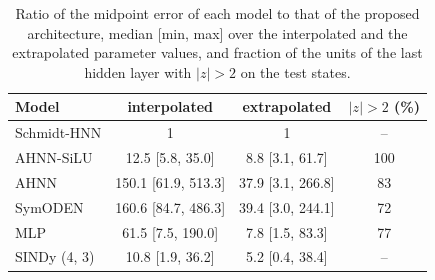 \begin{table}[htbp]
  \centering
  \caption{Ratio of the midpoint error of each model to that of the
    proposed architecture, median [min, max] over the interpolated and the extrapolated parameter values, and
    fraction of the units of the last hidden layer with $|z|>2$ on the test states.}
  \label{tab:beam-ratio}
  \footnotesize\setlength{\tabcolsep}{5pt}
  \begin{tabular}{lccc}
    \toprule
    Model & interpolated & extrapolated & $|z|>2$ (\%) \\
    \midrule
    Schmidt-HNN & 1 & 1 & -- \\
    AHNN-SiLU & 12.5 [5.8, 35.0] & 8.8 [3.1, 61.7] & 100 \\
    AHNN & 150.1 [61.9, 513.3] & 37.9 [3.1, 266.8] & 83 \\
    SymODEN & 160.6 [84.7, 486.3] & 39.4 [3.0, 244.1] & 72 \\
    MLP & 61.5 [7.5, 190.0] & 7.8 [1.5, 83.3] & 77 \\
    SINDy (4, 3) & 10.8 [1.9, 36.2] & 5.2 [0.4, 38.4] & -- \\
    \bottomrule
  \end{tabular}
\end{table}
